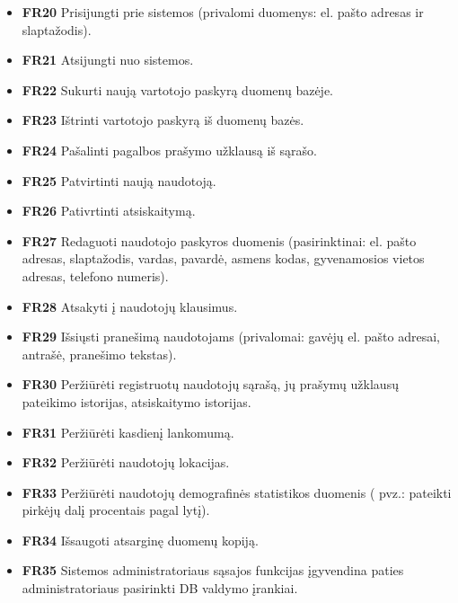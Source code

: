 \documentclass{VUMIFPSbakalaurinis}
\begin{document}
\begin{itemize}
	\item \textbf{FR20} Prisijungti prie sistemos (privalomi duomenys: el. pašto adresas ir slaptažodis).
	\item \textbf{FR21} Atsijungti nuo sistemos.
	\item \textbf{FR22} Sukurti naują vartotojo paskyrą duomenų bazėje.
	\item \textbf{FR23} Ištrinti vartotojo paskyrą iš duomenų bazės.
	\item \textbf{FR24} Pašalinti pagalbos prašymo užklausą iš sąrašo.
	\item \textbf{FR25} Patvirtinti naują naudotoją.
	\item \textbf{FR26} Pativrtinti atsiskaitymą.
	\item \textbf{FR27} Redaguoti naudotojo paskyros duomenis (pasirinktinai: el. pašto adresas, slaptažodis, vardas, pavardė, asmens kodas, gyvenamosios vietos adresas, telefono numeris).
	\item \textbf{FR28} Atsakyti į naudotojų klausimus.
	\item \textbf{FR29} Išsiųsti pranešimą naudotojams (privalomai: gavėjų el. pašto adresai, antrašė, pranešimo tekstas).
	\item \textbf{FR30} Peržiūrėti registruotų naudotojų sąrašą, jų prašymų užklausų pateikimo istorijas, atsiskaitymo istorijas.
	\item \textbf{FR31} Peržiūrėti kasdienį lankomumą.
	\item \textbf{FR32} Peržiūrėti naudotojų lokacijas.
	\item \textbf{FR33} Peržiūrėti naudotojų demografinės statistikos duomenis ( pvz.: pateikti pirkėjų dalį procentais pagal lytį).
	\item \textbf{FR34} Išsaugoti atsarginę duomenų kopiją.
	\item \textbf{FR35} Sistemos administratoriaus sąsajos funkcijas įgyvendina paties administratoriaus pasirinkti DB valdymo įrankiai.
\end{itemize}
\end{document}
